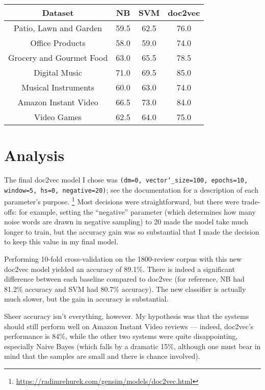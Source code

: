 \documentclass[12pt,a4paper,twoside]{article}
\begin{document}
\vspace{16px}

\begin{center}
\begin{tabular}{|c|c|c|c|}
\hline
\textbf{Dataset} & \textbf{NB} & \textbf{SVM} & \textbf{doc2vec}\\ \hline

Patio, Lawn and Garden & 59.5 & 62.5 & 76.0 \\ \hline
Office Products & 58.0 & 59.0 & 74.0 \\ \hline
Grocery and Gourmet Food & 63.0 & 65.5 & 78.5 \\ \hline
Digital Music & 71.0 & 69.5 & 85.0 \\ \hline
Musical Instruments & 60.0 & 63.0 & 74.0 \\ \hline
Amazon Instant Video & 66.5 & 73.0 & 84.0 \\ \hline
Video Games & 62.5 & 64.0 & 75.0 \\ \hline

\end{tabular}
\end{center}

\vspace{10px}

\section{Analysis}

The final doc2vec model I chose was \texttt{(dm=0, vector\char`_size=100, epochs=10, window=5, hs=0, negative=20)}; see the documentation for a description of each parameter's purpose. \footnote{\url{https://radimrehurek.com/gensim/models/doc2vec.html}} Most decisions were straightforward, but there were trade-offs: for example, setting the ``negative'' parameter (which determines how many noise words are drawn in negative sampling) to 20 made the model take much longer to train, but the accuracy gain was so substantial that I made the decision to keep this value in my final model.

Performing 10-fold cross-validation on the 1800-review corpus with this new doc2vec model yielded an accuracy of 89.1\%. There is indeed a significant difference between each baseline compared to doc2vec (for reference, NB had 81.2\% accuracy and SVM had 80.7\% accuracy). The new classifier is actually much slower, but the gain in accuracy is substantial.

Sheer accuracy isn't everything, however. My hypothesis was that the systems should still perform well on Amazon Instant Video reviews --- indeed, doc2vec's performance is 84\%, while the other two systems were quite disappointing, especially Naive Bayes (which falls by a dramatic 15\%, although one must bear in mind that the samples are small and there is chance involved).
\end{document}
